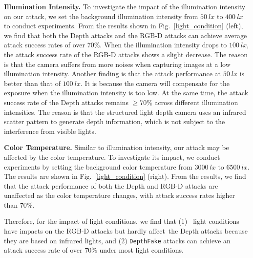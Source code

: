 \textbf{Illumination Intensity.} To investigate the impact of the illumination intensity on our attack, we set the background illumination intensity from $50~lx$ to $400~lx$ to conduct experiments.
From the results shown in Fig.~\ref{light_condition} (left), we find that both the Depth attacks and the RGB-D attacks can achieve average attack success rates of over $70\%$.
When the illumination intensity drops to $100~lx$, the attack success rate of the RGB-D attacks shows a slight decrease.
The reason is that the camera suffers from more noises when capturing images at a low illumination intensity. Another finding is that the attack performance at $50~lx$ is better than that of $100~lx$. It is because the camera will compensate for the exposure when the illumination intensity is too low.
At the same time, the attack success rate of the Depth attacks remains $\geq$$70\%$ across different illumination intensities. The reason is that the structured light depth camera uses an infrared scatter pattern to generate depth information, which is not subject to the interference from visible lights.


\textbf{Color Temperature.} Similar to illumination intensity, our attack may be affected by the color temperature. To investigate its impact, we conduct experiments by setting the background color temperature from $3000~lx$ to $6500~lx$.
The results are shown in Fig.~\ref{light_condition} (right). From the results, we find that the attack performance of both the Depth and RGB-D  attacks are unaffected as the color temperature changes, with attack success rates higher than $70\%$.

Therefore, for the impact of light conditions, we find that (1)  light conditions have impacts on the RGB-D attacks but hardly affect the Depth attacks because they are based on infrared lights, and (2) \texttt{DepthFake} attacks can achieve an attack success rate of over $70\%$ under most light conditions.

